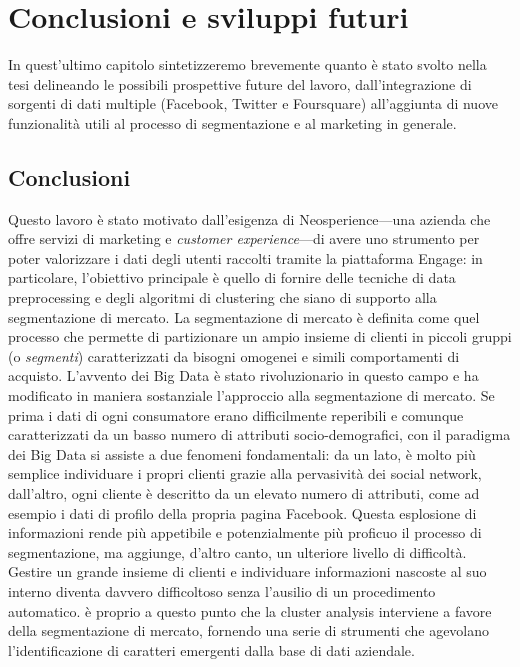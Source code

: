 \chapter{Conclusioni e sviluppi futuri}
\label{capitolo5}
\thispagestyle{empty}
In quest'ultimo capitolo sintetizzeremo brevemente quanto \`e stato svolto nella tesi delineando le possibili prospettive future del lavoro, dall'integrazione di sorgenti di dati multiple (Facebook, Twitter e Foursquare) all'aggiunta di nuove funzionalit\`a utili al processo di segmentazione e al marketing in generale.

\section{Conclusioni}
Questo lavoro \`e stato motivato dall'esigenza di Neosperience---una azienda che offre servizi di marketing e \textit{customer experience}---di avere uno strumento per poter valorizzare i dati degli utenti raccolti tramite la piattaforma Engage: in particolare, l'obiettivo principale \`e quello di fornire delle tecniche di data preprocessing e degli algoritmi di clustering che siano di supporto alla segmentazione di mercato. La segmentazione di mercato \`e definita come quel processo che permette di partizionare un ampio insieme di clienti in piccoli gruppi (o \textit{segmenti}) caratterizzati da bisogni omogenei e simili comportamenti di acquisto. L'avvento dei Big Data \`e stato rivoluzionario in questo campo e ha modificato in maniera sostanziale l'approccio alla segmentazione di mercato. Se prima i dati di ogni consumatore erano difficilmente reperibili e comunque caratterizzati da un basso numero di attributi socio-demografici, con il paradigma dei Big Data si assiste a due fenomeni fondamentali: da un lato, \`e molto pi\`u semplice individuare i propri clienti grazie alla pervasivit\`a dei social network, dall'altro, ogni cliente \`e descritto da un elevato numero di attributi, come ad esempio i dati di profilo della propria pagina Facebook. Questa esplosione di informazioni rende pi\`u appetibile e potenzialmente pi\`u proficuo il processo di segmentazione, ma aggiunge, d'altro canto, un ulteriore livello di difficolt\`a. Gestire un grande insieme di clienti e individuare informazioni nascoste al suo interno diventa davvero difficoltoso senza l'ausilio di un procedimento automatico. \`e proprio a questo punto che la cluster analysis interviene a favore della segmentazione di mercato, fornendo una serie di strumenti che agevolano l'identificazione di caratteri emergenti dalla base di dati aziendale.\\
